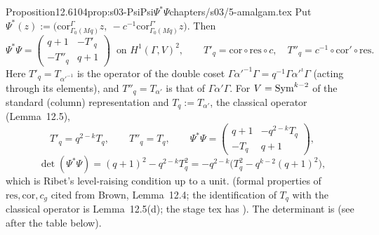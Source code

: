 \begin{quoted}{Proposition}{12.6}{104}{prop:s03-PsiPsi}{$\Psi^*\Psi$}{chapters/s03/5-amalgam.tex}\label{rpt:prop:s03-PsiPsi}
Put $\Psi^*(z):=\big(\mathrm{cor}^\Gamma_{\Gamma_0(Mq)}z,\ -c^{-1}\mathrm{cor}^{\Gamma'}_{\Gamma_0(Mq)}z\big)$. Then
\[\Psi^*\Psi=\begin{pmatrix}q+1&-T'_q\\-T''_q&q+1\end{pmatrix}\ \text{ on }H^1(\Gamma,V)^2,\qquad
T'_q=\mathrm{cor}\circ\mathrm{res}\circ c,\quad T''_q=c^{-1}\circ\mathrm{cor}'\circ\mathrm{res}.\]
Here $T'_q=T_{\alpha'^{-1}}$ is the operator of the double coset $\Gamma\alpha'^{-1}\Gamma=q^{-1}\Gamma\alpha'^\iota\Gamma$ (acting through its elements), and
$T''_q=T_{\alpha'}$ is that of $\Gamma\alpha'\Gamma$. For $V=\mathrm{Sym}^{k-2}$ of the standard (column) representation and $T_q:=T_{\alpha'}$, the classical
operator (Lemma~12.5),
\[T'_q=q^{2-k}T_q,\qquad T''_q=T_q,\qquad \Psi^*\Psi=\begin{pmatrix}q+1&-q^{2-k}T_q\\-T_q&q+1\end{pmatrix},\]
\[\det(\Psi^*\Psi)=(q+1)^2-q^{2-k}T_q^2=-q^{2-k}\big(T_q^2-q^{k-2}(q+1)^2\big),\]
which is Ribet's level-raising condition up to a unit. \stpmc{} (formal properties of $\mathrm{res},\mathrm{cor},c_g$ cited from Brown, Lemma~12.4;
the identification of $T_q$ with the classical operator is Lemma~12.5(d); the stage tex has \sttoprove). The determinant is \stcomp{}
(see after the table below).
\end{quoted}
